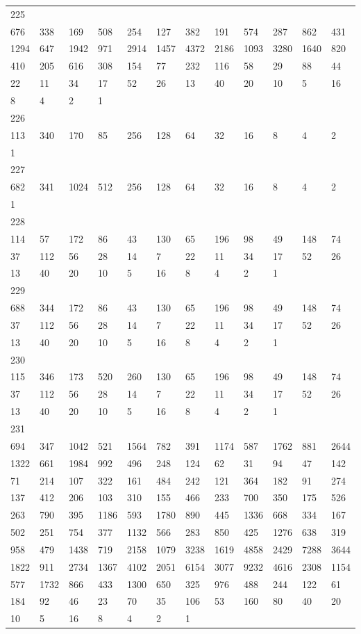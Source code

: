 \begin{longtable}{llllllllllll}
225&&&&&&&&&&&\\
676& 338& 169& 508& 254& 127& 382& 191& 574& 287& 862& 431\\
1294& 647& 1942& 971& 2914& 1457& 4372& 2186& 1093& 3280& 1640& 820\\
410& 205& 616& 308& 154& 77& 232& 116& 58& 29& 88& 44\\
22& 11& 34& 17& 52& 26& 13& 40& 20& 10& 5& 16\\
8& 4& 2& 1& \\

226&&&&&&&&&&&\\
113& 340& 170& 85& 256& 128& 64& 32& 16& 8& 4& 2\\
1& \\

227&&&&&&&&&&&\\
682& 341& 1024& 512& 256& 128& 64& 32& 16& 8& 4& 2\\
1& \\

228&&&&&&&&&&&\\
114& 57& 172& 86& 43& 130& 65& 196& 98& 49& 148& 74\\
37& 112& 56& 28& 14& 7& 22& 11& 34& 17& 52& 26\\
13& 40& 20& 10& 5& 16& 8& 4& 2& 1& \\

229&&&&&&&&&&&\\
688& 344& 172& 86& 43& 130& 65& 196& 98& 49& 148& 74\\
37& 112& 56& 28& 14& 7& 22& 11& 34& 17& 52& 26\\
13& 40& 20& 10& 5& 16& 8& 4& 2& 1& \\

230&&&&&&&&&&&\\
115& 346& 173& 520& 260& 130& 65& 196& 98& 49& 148& 74\\
37& 112& 56& 28& 14& 7& 22& 11& 34& 17& 52& 26\\
13& 40& 20& 10& 5& 16& 8& 4& 2& 1& \\

231&&&&&&&&&&&\\
694& 347& 1042& 521& 1564& 782& 391& 1174& 587& 1762& 881& 2644\\
1322& 661& 1984& 992& 496& 248& 124& 62& 31& 94& 47& 142\\
71& 214& 107& 322& 161& 484& 242& 121& 364& 182& 91& 274\\
137& 412& 206& 103& 310& 155& 466& 233& 700& 350& 175& 526\\
263& 790& 395& 1186& 593& 1780& 890& 445& 1336& 668& 334& 167\\
502& 251& 754& 377& 1132& 566& 283& 850& 425& 1276& 638& 319\\
958& 479& 1438& 719& 2158& 1079& 3238& 1619& 4858& 2429& 7288& 3644\\
1822& 911& 2734& 1367& 4102& 2051& 6154& 3077& 9232& 4616& 2308& 1154\\
577& 1732& 866& 433& 1300& 650& 325& 976& 488& 244& 122& 61\\
184& 92& 46& 23& 70& 35& 106& 53& 160& 80& 40& 20\\
10& 5& 16& 8& 4& 2& 1& \\


\end{longtable}
